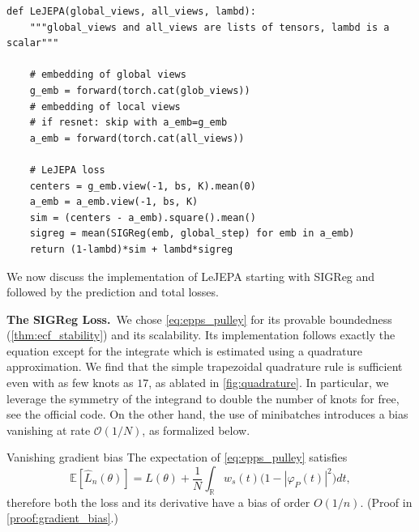 \begin{lstfloat}[t!]
\begin{lstlisting}[caption={LeJEPA implementation--works out-of-the-box on any dataset, with DDP, with any backbone, e.g., torchvision or timm. For non-ViT architectures (e.g., ResNet), set global\_views = all\_views. We use bs for the minibatch size, SIGReg is from \cref{lst:epps-pulley-pytorch}.},label={code:lejepa}]
def LeJEPA(global_views, all_views, lambd):
    """global_views and all_views are lists of tensors, lambd is a scalar"""

    # embedding of global views
    g_emb = forward(torch.cat(glob_views))
    # embedding of local views
    # if resnet: skip with a_emb=g_emb
    a_emb = forward(torch.cat(all_views))
    
    # LeJEPA loss
    centers = g_emb.view(-1, bs, K).mean(0)
    a_emb = a_emb.view(-1, bs, K)
    sim = (centers - a_emb).square().mean()
    sigreg = mean(SIGReg(emb, global_step) for emb in a_emb)
    return (1-lambd)*sim + lambd*sigreg
\end{lstlisting}
\end{lstfloat}

We now discuss the implementation of LeJEPA starting with SIGReg and followed by the prediction and total losses. 


{\bf The SIGReg Loss.}~We chose \eqref{eq:epps_pulley} for its provable boundedness (\cref{thm:ecf_stability}) and its scalability. Its implementation follows exactly the equation except for the integrate which is estimated using a quadrature approximation. We find that the simple trapezoidal quadrature rule is sufficient even with as few knots as $17$, as ablated in \cref{fig:quadrature}. In particular, we leverage the symmetry of the integrand to double the number of knots for free, see the official code. On the other hand, the use of minibatches introduces a bias vanishing at rate $\mathcal{O}(1/N)$, as formalized below.




\begin{theorem}[label={thm:gradient_bias}]{Vanishing gradient bias}{}
The expectation of \eqref{eq:epps_pulley} satisfies
\[
\mathbb{E}\left[\widehat{L}_n(\theta)\right]
=
L(\theta)+\frac{1}{N}\int_{\mathbb{R}} w_s(t)\big(1-|\varphi_P(t)|^2\big)dt,
\]
therefore both the loss and its derivative have a bias of order $O(1/n)$. (Proof in \cref{proof:gradient_bias}.)
\end{theorem}




